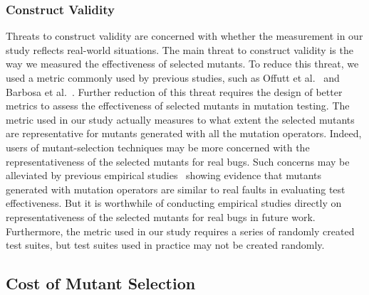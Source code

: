 \vspace{-1.5ex}
\subsubsection{Construct Validity}
\label{Construct}

Threats to construct validity are concerned with whether the
measurement in our study reflects real-world situations. The main
threat to construct validity is the way we measured the
effectiveness of selected mutants. To reduce this threat, we used a
metric commonly used by previous studies, such as Offutt et
al.~\cite{Offutt:96} and Barbosa et al.~\cite{Barbosa:01}. Further
reduction of this threat requires the design of better metrics to
assess the effectiveness of selected mutants in mutation testing.
The metric used in our study actually measures to what extent the
selected mutants are representative for mutants generated with all
the mutation operators. Indeed, users of mutant-selection techniques
may be more concerned with the representativeness of the selected
mutants for real bugs. Such concerns may be alleviated by previous
empirical studies~\cite{Andrews:05,Do:06} showing evidence that mutants
generated with mutation operators are similar to real faults in
evaluating test effectiveness. But it is worthwhile of conducting
empirical studies directly on representativeness of the selected
mutants for real bugs in future work.  Furthermore, the metric used in our
study requires a series of randomly created test suites, but test
suites used in practice may not be created randomly.

\vspace{-1.5ex}
\subsection{Cost of Mutant Selection}
\label{Cost}

